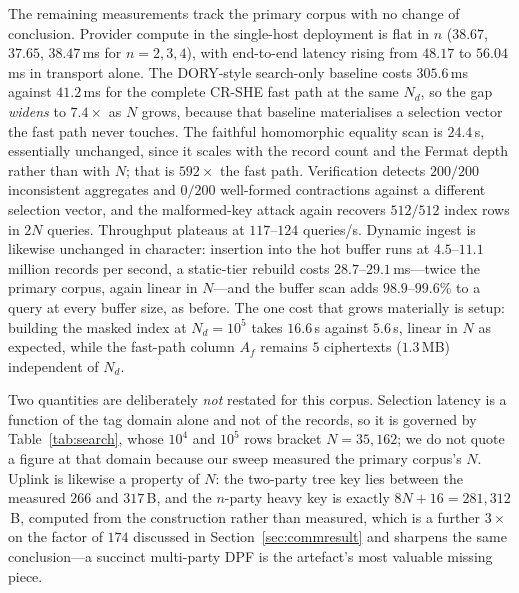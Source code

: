 \documentclass[journal]{IEEEtran}
\begin{document}
The remaining measurements track the primary corpus with no change of
conclusion. Provider compute in the single-host deployment is flat in $n$
($38.67$, $37.65$, $38.47$\,ms for $n=2,3,4$), with end-to-end latency rising
from $48.17$ to $56.04$\,ms in transport alone. The DORY-style search-only
baseline costs $305.6$\,ms against $41.2$\,ms for the complete CR-SHE fast path
at the same $N_d$, so the gap \emph{widens} to $7.4\times$ as $N$ grows, because
that baseline materialises a selection vector the fast path never touches. The
faithful homomorphic equality scan is $24.4$\,s, essentially unchanged, since it
scales with the record count and the Fermat depth rather than with $N$;
that is $592\times$ the fast path. Verification detects $200/200$ inconsistent
aggregates and $0/200$ well-formed contractions against a different selection
vector, and the malformed-key attack again recovers $512/512$ index rows in $2N$
queries. Throughput plateaus at $117$--$124$ queries/s. Dynamic ingest is
likewise unchanged in character: insertion into the hot buffer runs at
$4.5$--$11.1$ million records per second, a static-tier rebuild costs
$28.7$--$29.1$\,ms---twice the primary corpus, again linear in $N$---and the
buffer scan adds $98.9$--$99.6\%$ to a query at every buffer size, as before.
The one cost that grows materially is setup: building the masked index at
$N_d=10^5$ takes $16.6$\,s against $5.6$\,s, linear in $N$ as expected, while
the fast-path column $A_f$ remains $5$ ciphertexts ($1.3$\,MB) independent of
$N_d$.

Two quantities are deliberately \emph{not} restated for this corpus. Selection
latency is a function of the tag domain alone and not of the records, so it is
governed by Table~\ref{tab:search}, whose $10^4$ and $10^5$ rows bracket
$N=35{,}162$; we do not quote a figure at that domain because our sweep
measured the primary corpus's $N$. Uplink is likewise a property of $N$: the
two-party tree key lies between the measured $266$ and $317$\,B, and the
$n$-party heavy key is exactly $8N+16=281{,}312$\,B, computed from the
construction rather than measured, which is a further $3\times$ on the factor
of $174$ discussed in Section~\ref{sec:commresult} and sharpens the same
conclusion---a succinct multi-party DPF is the artefact's most valuable missing
piece.
\end{document}
